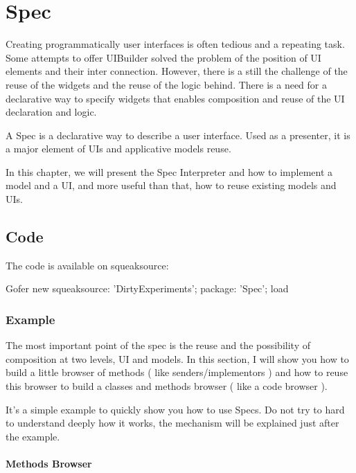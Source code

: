 \documentclass[a4paper,10pt,twoside]{book}
\begin{document}
\fi
\sloppy

\chapter{Spec}

Creating programmatically user interfaces is often tedious and a repeating task. Some attempts to offer UIBuilder solved the problem  of the position of UI elements and their inter connection. However, there is a still the challenge of the reuse of the widgets and the reuse of the logic behind. There is a need for a declarative way to specify widgets that enables composition and reuse of the UI declaration and logic. 

A Spec is a declarative way to describe a user interface. Used as a presenter, it is a major element of UIs and applicative models reuse.

In this chapter, we will present the Spec Interpreter and how to implement a model and a UI, and more useful than that, how to reuse existing models and UIs.

\section{Code}

The code is available on squeaksource:
\begin{code}{}
Gofer new
	squeaksource: 'DirtyExperiments';
	package: 'Spec';
	load
\end{code}

\subsection{Example}

The most important point of the spec is the reuse and the possibility of composition at two levels, UI and models.
In this section, I will show you how to build a little browser of methods ( like senders/implementors ) and how to reuse this browser to build a classes and methods browser ( like a code browser ).

It's a simple example to quickly show you how to use Specs. Do not try to hard to understand deeply how it works, the mechanism will be explained just after the example.

\subsubsection{Methods Browser}
\end{document}
